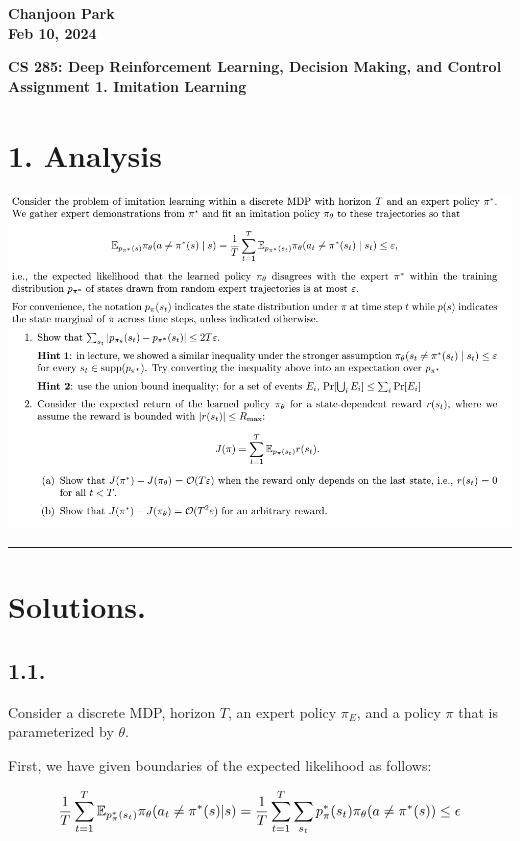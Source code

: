 \documentclass{article}%
\begin{document}
\begin{flushright}
\textbf{Chanjoon Park \\
Feb 10, 2024}
\end{flushright}

\begin{center}
\textbf{CS 285: Deep Reinforcement Learning, Decision Making, and Control \\
Assignment 1. Imitation Learning \\}
\end{center}

\section*{1. Analysis}

\includegraphics[width=\textwidth, center]{cs285_hw1_analysis.png}

\hrule

\section*{Solutions.}

\subsection*{1.1.}
Consider a discrete MDP, horizon $T$, an expert policy $\pi_E$, and a policy $\pi$ that is parameterized by $\theta$.

First, we have given boundaries of the expected likelihood as follows:

\begin{equation}
	\frac{1}{T}\sum_{t=1}^{T}\mathbb{E}_{p^*_\pi(s_t)}\pi_\theta(a_t \neq \pi^*(s)|s)=\frac{1}{T}\sum_{t=1}^{T}\sum_{s_t}p^*_\pi(s_t)\pi_\theta(a \neq \pi^*(s)) \leq \epsilon \\
\end{equation}
\end{document}
